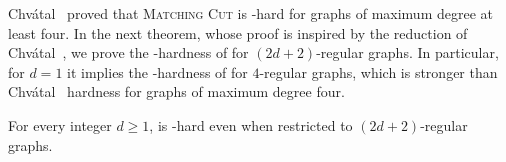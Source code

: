 Chv\'atal~\cite{chvatal_matching_cut} proved that \textsc{Matching Cut} is \NP-hard for graphs of maximum degree at least four. In the next theorem, whose proof is inspired by the reduction of Chv\'atal~\cite{chvatal_matching_cut}, we prove the \NP-hardness of  for $(2d+2)$-regular graphs. In particular, for $d=1$ it implies the \NP-hardness of  for $4$-regular graphs, which is stronger than Chv\'atal~\cite{chvatal_matching_cut} hardness for graphs of maximum degree four.


\begin{theorem}
    \label{thm:regular_nph}
    For every integer $d \geq 1$,  is \NP-hard even when restricted to $(2d+2)$-regular graphs.
\end{theorem}


